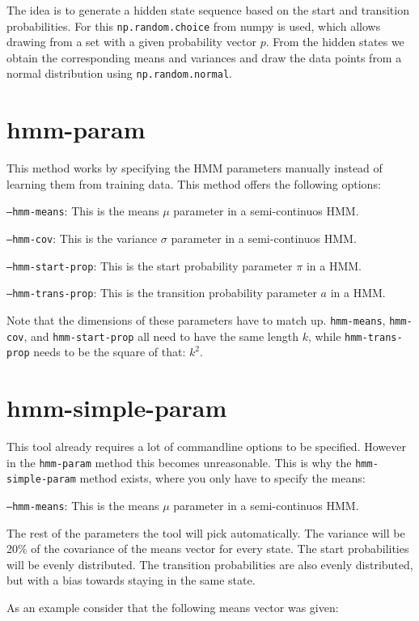 The idea is to generate a hidden state sequence based on the start and transition probabilities. For this \texttt{np.random.choice} from numpy is used, which allows drawing from a set with a given probability vector $p$. From the hidden states we obtain the corresponding means and variances and draw the data points from a normal distribution using \texttt{np.random.normal}.

\section{hmm-param}

This method works by specifying the HMM parameters manually instead of learning them from training data. This method offers the following options: 

\texttt{---hmm-means}: This is the means $\mu$ parameter in a semi-continuos HMM. 

\texttt{---hmm-cov}: This is the variance $\sigma$ parameter in a semi-continuos HMM. 

\texttt{---hmm-start-prop}: This is the start probability parameter $\pi$ in a HMM. 

\texttt{---hmm-trans-prop}: This is the transition probability parameter $a$ in a HMM. 

Note that the dimensions of these parameters have to match up. \texttt{hmm-means}, \texttt{hmm-cov}, and \texttt{hmm-start-prop} all need to have the same length $k$, while \texttt{hmm-trans-prop} needs to be the square of that: $k^2$. 

\section{hmm-simple-param}

This tool already requires a lot of commandline options to be specified. However in the \texttt{hmm-param} method this becomes unreasonable. This is why the \texttt{hmm-simple-param} method exists, where you only have to specify the means: 

\texttt{---hmm-means}: This is the means $\mu$ parameter in a semi-continuos HMM. 

The rest of the parameters the tool will pick automatically. The variance will be 20\% of the covariance of the means vector for every state. The start probabilities will be evenly distributed. The transition probabilities are also evenly distributed, but with a bias towards staying in the same state. 

As an example consider that the following means vector was given: 

